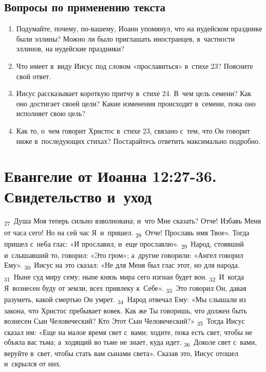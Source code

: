 \documentclass[a4paper,12pt]{article}
\begin{document}
\subsection*{Вопросы по применению текста} 
\begin{enumerate}
    \item Подумайте, почему, по-вашему, Иоанн упомянул, что на иудейском празднике были эллины? Можно ли было приглашать иностранцев, в~частности эллинов, на иудейские праздники?
    
    \myline
    
    \myline
    \item Что имеет в~виду Иисус под словом «прославиться» в~стихе 23? Поясните свой ответ. 
    
    \myline
    
    \myline
    \item Иисус рассказывает короткую притчу в~стихе 24. В~чем цель семени? Как оно достигает своей цели? Какие изменения происходят в~семени, пока оно исполняет свою цель? 
    
    \myline
    
    \myline
    \item Как то, о~чем говорит Христос в~стихе 23, связано с~тем, что Он говорит ниже в~последующих стихах? Постарайтесь ответить максимально подробно. 
    
    \myline
    
    \myline
\end{enumerate}



\section{Евангелие от Иоанна 12:27-36. Свидетельство и~уход}

\textsubscript{27}~Душа Моя теперь сильно взволнована; и~что Мне сказать? Отче! Избавь Меня от часа сего! Но на сей час Я~и~пришел. \textsubscript{28}~Отче! Прославь имя Твое». Тогда пришел с~неба глас: «И прославил, и~еще прославлю». \textsubscript{29}~Народ, стоявший и~слышавший то, говорил: «Это гром»; а~другие говорили: «Ангел говорил Ему». \textsubscript{30}~Иисус на это сказал: «Не для Меня был глас этот, но для народа. \textsubscript{31}~Ныне суд миру сему; ныне князь мира сего изгнан будет вон. \textsubscript{32}~И~когда Я~вознесен буду от земли, всех привлеку к~Себе». \textsubscript{33}~Это говорил Он, давая разуметь, какой смертью Он умрет. \textsubscript{34}~Народ отвечал Ему: «Мы слышали из закона, что Христос пребывает вовек. Как же Ты говоришь, что должен быть вознесен Сын Человеческий? Кто Этот Сын Человеческий?» \textsubscript{35}~Тогда Иисус сказал им: «Еще на малое время свет с~вами; ходите, пока есть свет, чтобы не объяла вас тьма; а~ходящий во тьме не знает, куда идет. \textsubscript{36}~Доколе свет с~вами, веруйте в~свет, чтобы стать вам сынами света». Сказав это, Иисус отошел и~скрылся от них. 
\end{document}
